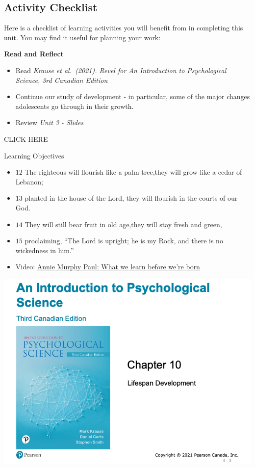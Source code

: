 \documentclass[
]{book}
\providecommand{\tightlist}{%
  \setlength{\itemsep}{0pt}\setlength{\parskip}{0pt}}
\begin{document}
\hypertarget{activity-checklist-2}{%
\subsection*{Activity Checklist}\label{activity-checklist-2}}

Here is a checklist of learning activities you will benefit from in completing this unit. You may find it useful for planning your work:

\textbf{Read and Reflect}

\begin{itemize}
\tightlist
\item
  Read \emph{Krause et al.~(2021). Revel for An Introduction to Psychological Science, 3rd Canadian Edition}\\
\item
  Continue our study of development - in particular, some of the major changes adolescents go through in their growth.\\
\item
  Review \emph{Unit 3 - Slides}
\end{itemize}

CLICK HERE

Learning Objectives

\begin{itemize}
\tightlist
\item
  \(\scriptstyle 12\) The righteous will flourish like a palm tree,they will grow like a cedar of Lebanon;
\item
  \(\scriptstyle 13\) planted in the house of the Lord, they will flourish in the courts of our God.
\item
  \(\scriptstyle 14\) They will still bear fruit in old age,they will stay fresh and green,
\item
  \(\scriptstyle 15\) proclaiming, ``The Lord is upright;
  he is my Rock, and there is no wickedness in him.''
\item
  Video: \href{http://www.ted.com/talks/annie_murphy_paul_what_we_learn_before_we_re_born.html}{Annie Murphy Paul: What we learn before we're born}
\end{itemize}

\includegraphics{assets/unit_3/slide_3.png}
\end{document}
